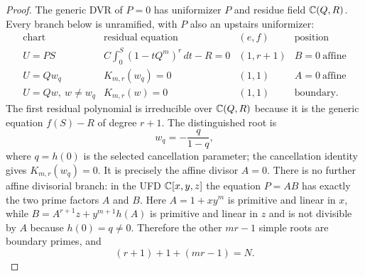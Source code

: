 \begin{proof}
The generic DVR of $P=0$ has uniformizer $P$ and residue field $\mathbb C(Q,R)$.
Every branch below is unramified, with $P$ also an upstairs uniformizer:
\[
\begin{array}{c|c|c|c}
 \text{chart}&\text{residual equation}&(e,f)&\text{position}\\ \hline
 U=PS&C\int_0^S(1-tQ^m)^r\,dt-R=0&(1,r+1)&B=0\ \text{affine}\\
 U=Qw_q&K_{m,r}(w_q)=0&(1,1)&A=0\ \text{affine}\\
 U=Qw,\ w\ne w_q&K_{m,r}(w)=0&(1,1)&\text{boundary}.
\end{array}                                                \tag{4.16}
\label{eq:cancellation-projective-branches}
\]
The first residual polynomial is irreducible over $\mathbb C(Q,R)$ because it is
the generic equation $f(S)-R$ of degree $r+1$.  The distinguished root is
\[
 w_q=-\frac{q}{1-q},                                     \tag{4.17}
\]
where $q=h(0)$ is the selected cancellation parameter; the cancellation
identity gives $K_{m,r}(w_q)=0$.  It is precisely the affine divisor $A=0$.
There is no further affine divisorial branch: in the UFD $\mathbb C[x,y,z]$ the
equation $P=AB$ has exactly the two prime factors $A$ and $B$.  Here
$A=1+xy^m$ is primitive and linear in $x$, while
$B=A^{r+1}z+y^{m+1}h(A)$ is primitive and linear in $z$ and is not divisible
by $A$ because $h(0)=q\ne0$.  Therefore the other $mr-1$ simple roots are
boundary primes, and
\[
 (r+1)+1+(mr-1)=N.                                       \tag{4.18}
\]


\end{proof}
